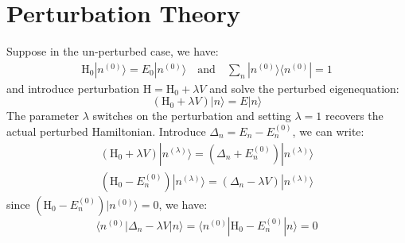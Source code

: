 \documentclass{article}
\newcommand{\huptb}{\text{H}_0}
\newcommand{\order}[2]{#1^{(#2)}}
\newcommand{\statebra}[1]{\langle #1 |}
\newcommand{\stateket}[1]{| #1 \rangle}
\begin{document}
\section{Perturbation Theory}
Suppose in the un-perturbed case, we have:
\begin{gather}
    \huptb \stateket{\order{n}{0}} = E_0 \stateket{\order{n}{0}} \quad \text{and} \quad
    \sum_n \stateket{\order{n}{0}}\statebra{\order{n}{0}} = 1
\end{gather}
and introduce perturbation $\text{H} = \huptb + \lambda V$ and solve the 
perturbed eigenequation:
\begin{equation}
    (\huptb + \lambda V) \stateket{n} = E \stateket{n}
\end{equation}
The parameter $\lambda$ switches on the perturbation and setting $\lambda = 1$ 
recovers the actual perturbed Hamiltonian. 
Introduce $\Delta_n = E_n - \order{E_n}{0}$, we 
can write:
\begin{align}
    (\huptb + \lambda V) \stateket{\order{n}{\lambda}} = (\Delta_n + \order{E_n}{0}) \stateket{\order{n}{\lambda}} \\
    (\huptb - \order{E_n}{0}) \stateket{\order{n}{\lambda}} = (\Delta_n - \lambda V) \stateket{\order{n}{\lambda}}
\end{align}
since $(\huptb - \order{E_n}{0})\stateket{\order{n}{0}} = 0$, we have:
\begin{equation}
    \label{E:result1}
    \statebra{\order{n}{0}} \Delta_n - \lambda V \stateket{n}
    = \statebra{\order{n}{0}} \huptb - \order{E_n}{0} \stateket{n} 
    = 0
\end{equation} 
\end{document}
